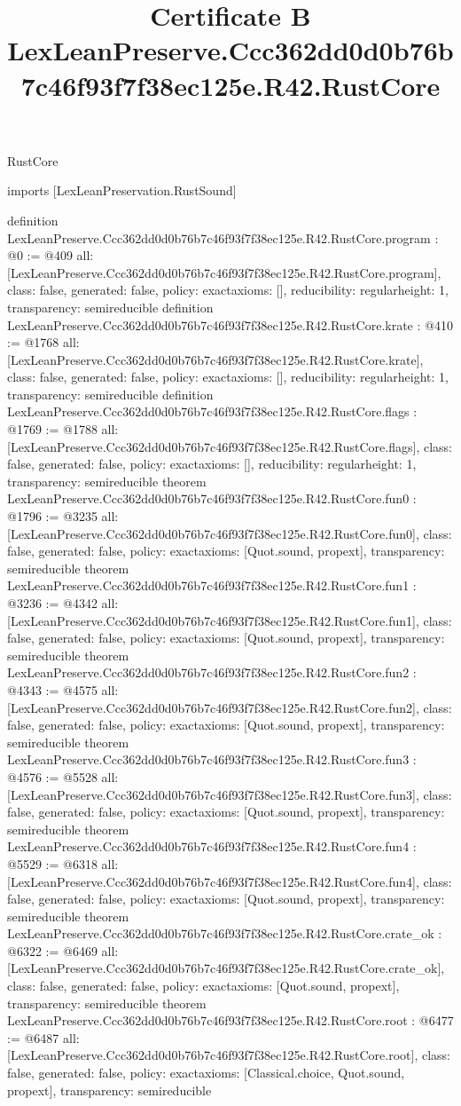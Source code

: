 \begin{lexlean}{RustCore}
\title{Certificate B LexLeanPreserve.Ccc362dd0d0b76b7c46f93f7f38ec125e.R42.RustCore}
\begin{coremodule}
imports [LexLeanPreservation.RustSound]

definition LexLeanPreserve.Ccc362dd0d0b76b7c46f93f7f38ec125e.R42.RustCore.program : @0 := @409 {
  all: [LexLeanPreserve.Ccc362dd0d0b76b7c46f93f7f38ec125e.R42.RustCore.program],
  class: false,
  generated: false,
  policy: exact{axioms: []},
  reducibility: regular{height: 1},
  transparency: semireducible
}
definition LexLeanPreserve.Ccc362dd0d0b76b7c46f93f7f38ec125e.R42.RustCore.krate : @410 := @1768 {
  all: [LexLeanPreserve.Ccc362dd0d0b76b7c46f93f7f38ec125e.R42.RustCore.krate],
  class: false,
  generated: false,
  policy: exact{axioms: []},
  reducibility: regular{height: 1},
  transparency: semireducible
}
definition LexLeanPreserve.Ccc362dd0d0b76b7c46f93f7f38ec125e.R42.RustCore.flags : @1769 := @1788 {
  all: [LexLeanPreserve.Ccc362dd0d0b76b7c46f93f7f38ec125e.R42.RustCore.flags],
  class: false,
  generated: false,
  policy: exact{axioms: []},
  reducibility: regular{height: 1},
  transparency: semireducible
}
theorem LexLeanPreserve.Ccc362dd0d0b76b7c46f93f7f38ec125e.R42.RustCore.fun0 : @1796 := @3235 {
  all: [LexLeanPreserve.Ccc362dd0d0b76b7c46f93f7f38ec125e.R42.RustCore.fun0],
  class: false,
  generated: false,
  policy: exact{axioms: [Quot.sound, propext]},
  transparency: semireducible
}
theorem LexLeanPreserve.Ccc362dd0d0b76b7c46f93f7f38ec125e.R42.RustCore.fun1 : @3236 := @4342 {
  all: [LexLeanPreserve.Ccc362dd0d0b76b7c46f93f7f38ec125e.R42.RustCore.fun1],
  class: false,
  generated: false,
  policy: exact{axioms: [Quot.sound, propext]},
  transparency: semireducible
}
theorem LexLeanPreserve.Ccc362dd0d0b76b7c46f93f7f38ec125e.R42.RustCore.fun2 : @4343 := @4575 {
  all: [LexLeanPreserve.Ccc362dd0d0b76b7c46f93f7f38ec125e.R42.RustCore.fun2],
  class: false,
  generated: false,
  policy: exact{axioms: [Quot.sound, propext]},
  transparency: semireducible
}
theorem LexLeanPreserve.Ccc362dd0d0b76b7c46f93f7f38ec125e.R42.RustCore.fun3 : @4576 := @5528 {
  all: [LexLeanPreserve.Ccc362dd0d0b76b7c46f93f7f38ec125e.R42.RustCore.fun3],
  class: false,
  generated: false,
  policy: exact{axioms: [Quot.sound, propext]},
  transparency: semireducible
}
theorem LexLeanPreserve.Ccc362dd0d0b76b7c46f93f7f38ec125e.R42.RustCore.fun4 : @5529 := @6318 {
  all: [LexLeanPreserve.Ccc362dd0d0b76b7c46f93f7f38ec125e.R42.RustCore.fun4],
  class: false,
  generated: false,
  policy: exact{axioms: [Quot.sound, propext]},
  transparency: semireducible
}
theorem LexLeanPreserve.Ccc362dd0d0b76b7c46f93f7f38ec125e.R42.RustCore.crate_ok : @6322 := @6469 {
  all: [LexLeanPreserve.Ccc362dd0d0b76b7c46f93f7f38ec125e.R42.RustCore.crate_ok],
  class: false,
  generated: false,
  policy: exact{axioms: [Quot.sound, propext]},
  transparency: semireducible
}
theorem LexLeanPreserve.Ccc362dd0d0b76b7c46f93f7f38ec125e.R42.RustCore.root : @6477 := @6487 {
  all: [LexLeanPreserve.Ccc362dd0d0b76b7c46f93f7f38ec125e.R42.RustCore.root],
  class: false,
  generated: false,
  policy: exact{axioms: [Classical.choice, Quot.sound, propext]},
  transparency: semireducible
}


\end{coremodule}
\end{lexlean}
